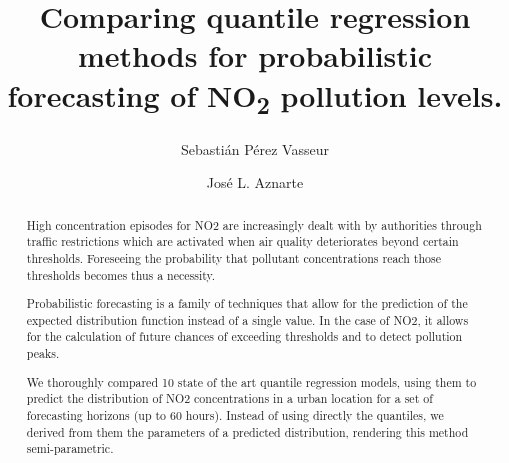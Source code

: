 \documentclass[a4paper,3p,sort&compress]{elsarticle}
\begin{document}
\linenumbers

\newcommand{\no}{NO\textsubscript{2}\xspace}

\begin{frontmatter}

  \title{Comparing quantile regression methods for probabilistic forecasting of \no pollution levels.}


  \author{Sebasti\'an P\'erez Vasseur}
  \author{Jos\'e L. Aznarte}
  \address{Artificial Intelligence Department\\Universidad Nacional de
    Educaci\'on a Distancia --- UNED\\c/ Juan del Rosal, 16, Madrid, Spain}
  
 
\begin{abstract}

High concentration episodes for NO2 are increasingly dealt with by authorities
through traffic restrictions which are activated when air quality deteriorates
beyond certain thresholds. Foreseeing the probability that pollutant
concentrations reach those thresholds becomes thus a necessity.

Probabilistic forecasting is a family of techniques that allow for the
prediction of the expected distribution function instead of a single value. In
the case of NO2, it allows for the calculation of future chances of exceeding
thresholds and to detect pollution peaks. 

We thoroughly compared 10 state of the art quantile regression models,
using them to predict the distribution of NO2 concentrations in a urban location
for a set of forecasting horizons (up to 60 hours). Instead of using directly the 
quantiles, we derived from them the parameters of a predicted distribution, rendering this 
method semi-parametric.


\end{abstract}
\end{frontmatter}
\end{document}
